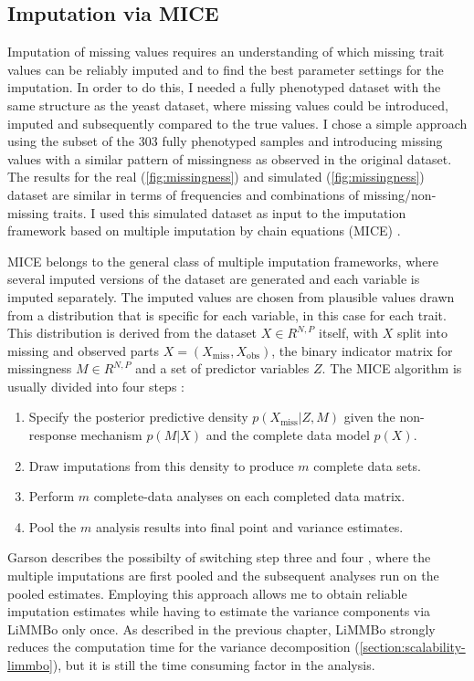 \subsection{Imputation via MICE} 
Imputation of missing values requires an understanding of which missing trait values can be reliably imputed and to find the best parameter settings for the imputation. In order to do this, I needed a fully phenotyped dataset with the same structure as the yeast dataset, where missing values could be introduced, imputed and subsequently compared to the true values. I chose a simple approach using the subset of the \num{303} fully phenotyped samples and introducing missing values with a similar pattern of missingness as observed in the original dataset. The results for the real (\cref{fig:missingness}) and simulated (\cref{fig:missingness}) dataset are similar in terms of frequencies and combinations of missing/non-missing traits. I used this simulated dataset as input to the imputation framework based on multiple imputation by chain equations (MICE) \citep{vanBuuren2011}. 

MICE belongs to the general class of multiple imputation frameworks, where several imputed versions of the dataset are generated and each variable is imputed separately. The imputed values are chosen from plausible values drawn from a distribution that is specific for each variable, in this case for each trait. This distribution is derived from the dataset \(X \in R^{N,P}\) itself,  with \(X\) split into missing and observed parts \(X = (X_\text{miss}, X_\text{obs})\), the binary indicator matrix for missingness \(M \in R^{N,P}\) and a set of predictor variables \(Z\). The MICE algorithm is usually divided into four steps \citep{Rubin1987,vanBuuren1999,Pigott2001}:
\begin{enumerate}
\item Specify the posterior predictive density \(p(X_\text{miss} | Z, M)\) given the non-response mechanism  \(p(M | X)\)  and the complete data model  \(p(X)\).
\item Draw imputations from this density to produce \(m\) complete data sets. 
\item Perform \(m\) complete-data analyses on each completed data matrix. 
\item Pool the \(m\) analysis results into final point and variance estimates.
\end{enumerate}
Garson describes the possibilty of switching step three and four \citeyear{Garson2015}, where the multiple imputations are first pooled and the subsequent analyses run on the pooled estimates. Employing this approach allows me to  obtain reliable imputation estimates while having to estimate the variance components via LiMMBo only once. As described in the previous chapter, LiMMBo strongly reduces the computation time for the variance decomposition (\cref{section:scalability-limmbo}), but it is still the time consuming factor in the analysis. 

